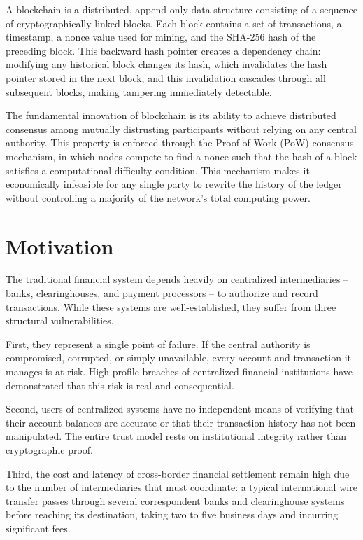 \documentclass[12pt,a4paper]{report}
\begin{document}
A blockchain is a distributed, append-only data structure consisting of a sequence of
cryptographically linked blocks. Each block contains a set of transactions, a timestamp,
a nonce value used for mining, and the SHA-256 hash of the preceding block. This backward
hash pointer creates a dependency chain: modifying any historical block changes its hash,
which invalidates the hash pointer stored in the next block, and this invalidation cascades
through all subsequent blocks, making tampering immediately detectable.

The fundamental innovation of blockchain is its ability to achieve distributed consensus
among mutually distrusting participants without relying on any central authority. This
property is enforced through the Proof-of-Work (PoW) consensus mechanism, in which nodes
compete to find a nonce such that the hash of a block satisfies a computational difficulty
condition. This mechanism makes it economically infeasible for any single party to rewrite
the history of the ledger without controlling a majority of the network's total computing
power.

\section{Motivation}

The traditional financial system depends heavily on centralized intermediaries -- banks,
clearinghouses, and payment processors -- to authorize and record transactions. While
these systems are well-established, they suffer from three structural vulnerabilities.

First, they represent a single point of failure. If the central authority is compromised,
corrupted, or simply unavailable, every account and transaction it manages is at risk.
High-profile breaches of centralized financial institutions have demonstrated that this
risk is real and consequential.

Second, users of centralized systems have no independent means of verifying that their
account balances are accurate or that their transaction history has not been manipulated.
The entire trust model rests on institutional integrity rather than cryptographic proof.

Third, the cost and latency of cross-border financial settlement remain high due to the
number of intermediaries that must coordinate: a typical international wire transfer
passes through several correspondent banks and clearinghouse systems before reaching its
destination, taking two to five business days and incurring significant fees.
\end{document}
